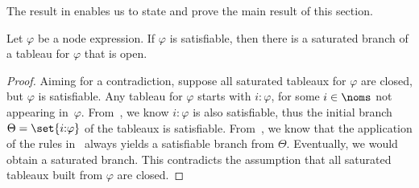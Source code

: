 The result in  enables us to state and prove the main result of this section.

\begin{thm}[Soundness]
    \label{thm:soundness}
    Let $\varphi$ be a node expression. If $\varphi$ is satisfiable, then there is a saturated branch of a tableau for $\varphi$ that is open.
\end{thm}

\begin{proof}
    Aiming for a contradiction, suppose all saturated tableaux for $\varphi$ are closed, but $\varphi$ is satisfiable. Any tableau for $\varphi$ starts with $i{:}\varphi$, for some $i\in\noms$ not appearing in~$\varphi$.
    From~, we know $i{:}{\varphi}$ is also satisfiable, thus the initial branch $\Theta=\set{i{:}\varphi}$ of the tableaux is satisfiable. 
    From~, we know that the application of the rules in~ always yields a satisfiable branch from $\Theta$.
    Eventually, we would obtain a saturated branch.
    This contradicts the assumption that all saturated tableaux built from $\varphi$ are closed.
\end{proof}




